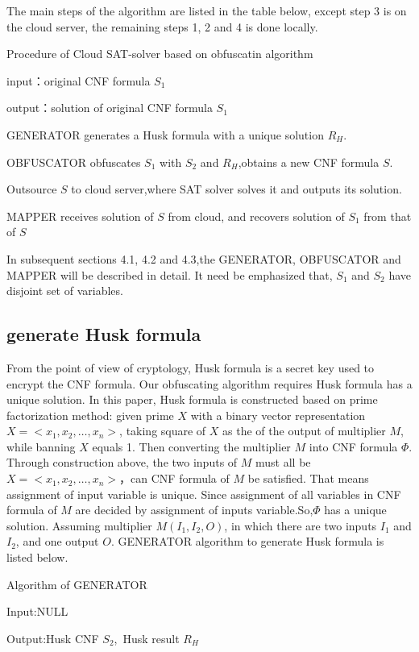 \documentclass[runningheads,a4paper]{llncs}
\begin{document}
The main steps of the algorithm are listed in the table below, except step 3 is on the cloud server, the remaining steps 1, 2 and 4 is done locally.

\noindent Procedure of Cloud SAT-solver based on obfuscatin algorithm

\noindent input：original CNF formula $S_1$  

\noindent output：solution of original CNF formula $S_1$ 

 GENERATOR generates a Husk formula with a unique solution $R_H$.

 OBFUSCATOR obfuscates $S_1$  with $S_2$ and $R_H$,obtains a new CNF formula $S$.

 Outsource $S$ to cloud server,where SAT solver solves it and outputs its solution. 

 MAPPER receives solution of $S$ from cloud, and recovers solution of $S_1$ from that of $S$ 

In subsequent sections 4.1, 4.2 and 4.3,the GENERATOR, OBFUSCATOR and MAPPER will be described in detail. 
It need be emphasized that, $S_1$  and $S_2$ have disjoint set of variables.
\subsection{generate Husk formula}
From the point of view of cryptology, Husk formula is a secret key used to encrypt the CNF formula. 
Our obfuscating algorithm requires Husk formula has a unique solution.
In this paper, Husk formula is constructed based on prime factorization method:
given prime $X$ with a binary vector representation $X = <x_1,x_2,\dots,x_n>$, 
taking square of $X$ as the of the output of multiplier $M$, while banning $X$ equals 1.
Then converting the multiplier $M$ into CNF formula $\Phi$.
Through construction above, the two inputs of $M$ must all be $X = <x_1,x_2,\dots,x_n>$，can CNF formula of $M$ be satisfied.
That means assignment of input variable is unique.
Since assignment of all variables in CNF formula of $M$ are decided by assignment of inputs variable.So,$\Phi$ has a unique solution. 
Assuming multiplier $M (I_1, I_2, O)$, in which there are two inputs $I_1$ and $I_2$, and one output $O$.
GENERATOR algorithm to generate Husk formula is listed below.

\noindent Algorithm of GENERATOR

Input:NULL

Output:Husk CNF $S_2$,~Husk result $R_H$
\end{document}
